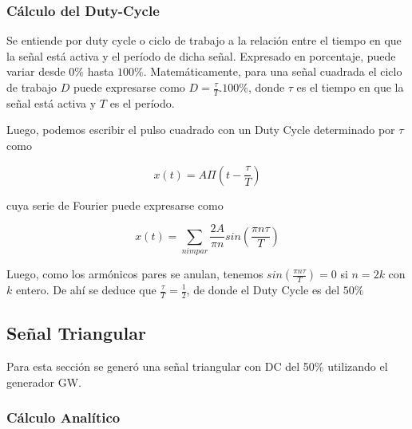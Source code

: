 \begin{table}[]
\end{table}

\subsubsection{Cálculo del Duty-Cycle}	

Se entiende por duty cycle o ciclo de trabajo a la relación entre el tiempo en que la señal está activa y el período de dicha señal. Expresado en porcentaje, puede variar desde $0\%$ hasta $100\%$. Matemáticamente, para una señal cuadrada el ciclo de trabajo $D$ puede expresarse como $D=\frac{\tau}{T}.100\%$, donde $\tau$ es el tiempo en que la señal está activa y $T$ es el período.

Luego, podemos escribir el pulso cuadrado con un Duty Cycle determinado por $\tau$ como 

\begin{equation}
    x(t)=A\Pi(t-\frac{\tau}{T})
\end{equation}

cuya serie de Fourier puede expresarse como 

\begin{equation}
x(t)=\sum_{n impar}\frac{2A}{\pi n} sin(\frac{\pi n\tau}{T})
\end{equation}

Luego, como los armónicos pares se anulan, tenemos $sin(\frac{\pi n\tau}{T})=0$ si $n=2k$ con $k$ entero. De ahí se deduce que $\frac{\tau}{T}=\frac{1}{2}$, de donde el Duty Cycle es del $50\%$

\subsection{Señal Triangular}

Para esta sección se generó una señal triangular con DC del 50\% utilizando el generador GW.

\subsubsection{Cálculo Analítico}

